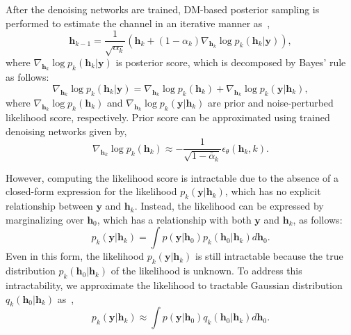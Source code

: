 \documentclass[lettersize,journal]{IEEEtran}
\begin{document}
After the denoising networks are trained, DM-based posterior sampling is performed to estimate the channel in an iterative manner as~\cite{zhouGenerativeDiffusionModels2025},
\begin{equation}
\label{eq:posterior_sampling}
\mathbf{h}_{k-1} = \frac{1}{\sqrt{ \alpha_{k} }}(\mathbf{h}_{k}+(1-\alpha_{k})\nabla_{\mathbf{h}_{k}}\log p_{k}(\mathbf{h}_{k}|\mathbf{y})),
\end{equation}
where $\nabla_{\mathbf{h}_{k}}\log p_{k}(\mathbf{h}_{k}|\mathbf{y})$ is posterior score, which is decomposed by Bayes' rule as follows:
\begin{equation}
\label{eq:posterior_score}
\nabla_{\mathbf{h}_{k}}\log p_{k}(\mathbf{h}_{k}|\mathbf{y}) = \nabla_{\mathbf{h}_{k}}\log p_{k}(\mathbf{h}_{k})+\nabla_{\mathbf{h}_{k}}\log p_{k}(\mathbf{y}|\mathbf{h}_{k}),
\end{equation}
where $\nabla_{\mathbf{h}_{k}}\log p_{k}(\mathbf{h}_{k})$ and $\nabla_{\mathbf{h}_{k}}\log p_{k}(\mathbf{y}|\mathbf{h}_{k})$ are prior and noise-perturbed likelihood score, respectively.
Prior score can be approximated using trained denoising networks given by,
\begin{equation}
\label{eq:prior_score}
\nabla_{\mathbf{h}_{k}}\log p_{k}(\mathbf{h}_{k})\approx -\frac{1}{\sqrt{ 1-\bar{\alpha}_{k} }}\epsilon_{\theta}(\mathbf{h}_{k},k).
\end{equation}

However, computing the likelihood score is intractable due to the absence of a closed-form expression for the likelihood $p_{k}(\mathbf{y}|\mathbf{h}_{k})$, which has no explicit relationship between $\mathbf{y}$ and $\mathbf{h}_{k}$. Instead, the likelihood can be expressed by marginalizing over $\mathbf{h}_{0}$, which has a relationship with both $\mathbf{y}$ and $\mathbf{h}_{k}$, as follows:
\begin{equation}
p_{k}(\mathbf{y}|\mathbf{h}_{k}) = \int p(\mathbf{y}|\mathbf{h}_{0})p_{k}(\mathbf{h}_{0}|\mathbf{h}_{k})d\mathbf{h}_{0}.
\end{equation}
Even in this form, the likelihood $p_{k}(\mathbf{y}|\mathbf{h}_{k})$ is still intractable because the true distribution $p_{k}(\mathbf{h}_{0}|\mathbf{h}_{k})$ of the likelihood is unknown. To address this intractability, we approximate the likelihood to tractable Gaussian distribution $q_{k}(\mathbf{h}_{0}|\mathbf{h}_{k})$ as~\cite{arvinteMIMOChannelEstimation2023,zhouGenerativeDiffusionModels2025},
\begin{equation}
p_{k}(\mathbf{y}|\mathbf{h}_{k}) \approx \int p(\mathbf{y}|\mathbf{h}_{0})q_{k}(\mathbf{h}_{0}|\mathbf{h}_{k})d\mathbf{h}_{0}.
\end{equation}
\end{document}
